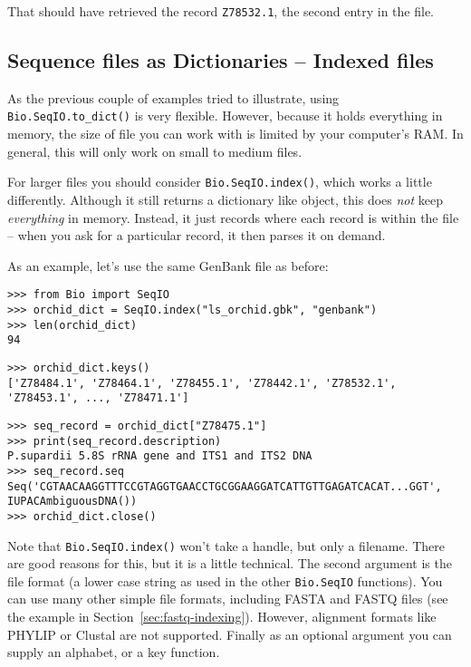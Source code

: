 \noindent That should have retrieved the record \texttt{Z78532.1}, the second entry in the file.

\subsection{Sequence files as Dictionaries -- Indexed files}
\label{sec:SeqIO-index}

As the previous couple of examples tried to illustrate, using
\verb|Bio.SeqIO.to_dict()| is very flexible. However, because it holds
everything in memory, the size of file you can work with is limited by your
computer's RAM. In general, this will only work on small to medium files.

For larger files you should consider
\verb|Bio.SeqIO.index()|, which works a little differently. Although
it still returns a dictionary like object, this does \emph{not} keep
\emph{everything} in memory. Instead, it just records where each record
is within the file -- when you ask for a particular record, it then parses
it on demand.

As an example, let's use the same GenBank file as before:

\begin{verbatim}
>>> from Bio import SeqIO
>>> orchid_dict = SeqIO.index("ls_orchid.gbk", "genbank")
>>> len(orchid_dict)
94
\end{verbatim}
\begin{verbatim}
>>> orchid_dict.keys()
['Z78484.1', 'Z78464.1', 'Z78455.1', 'Z78442.1', 'Z78532.1', 'Z78453.1', ..., 'Z78471.1']
\end{verbatim}
\begin{verbatim}
>>> seq_record = orchid_dict["Z78475.1"]
>>> print(seq_record.description)
P.supardii 5.8S rRNA gene and ITS1 and ITS2 DNA
>>> seq_record.seq
Seq('CGTAACAAGGTTTCCGTAGGTGAACCTGCGGAAGGATCATTGTTGAGATCACAT...GGT', IUPACAmbiguousDNA())
>>> orchid_dict.close()
\end{verbatim}

\noindent Note that \verb|Bio.SeqIO.index()| won't take a handle,
but only a filename. There are good reasons for this, but it is a little
technical. The second argument is the file format (a lower case string as
used in the other \verb|Bio.SeqIO| functions). You can use many other
simple file formats, including FASTA and FASTQ files (see the example in
Section~\ref{sec:fastq-indexing}). However, alignment
formats like PHYLIP or Clustal are not supported. Finally as an optional
argument you can supply an alphabet, or a key function.

